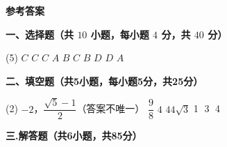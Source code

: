 \documentclass[11pt,a4paper]{ctexart}
\newcommand{\sectiontitle}[1]{
  \par\noindent\textbf{#1}\par%
  }
\newcounter{chapPage}
\begin{document}
\clearpage %
\setcounter{enumi}{0}   %
{} %
\setcounter{chapPage}{1} %

\begin{center} 
    {\LARGE \textbf{参考答案}}\\[1em]
\end{center}

\sectiontitle{一、选择题（共 $10$ 小题，每小题 $4$ 分，共 $40$ 分）}

    \begin{tasks}[label=(\arabic*), after-item-skip=0.6em,start=1] (5)
        \task $C$ 
        \task $C$
        \task $C$
        \task $A$        
        \task $B$
        \task $C$        
        \task $B$
        \task $D$        
        \task $D$
        \task $A$
    \end{tasks}

\sectiontitle{二、填空题（共5小题，每小题5分，共25分）}

    \begin{tasks}[label=(\arabic*), after-item-skip=0.6em,start=11] (2)
        \task $-2$，$\dfrac{\sqrt{5}-1}{2}$（答案不唯一） 
        \task $\dfrac{9}{8}$
        \task $4$
        \task $44 \sqrt{3}$        
        \task \textcircled{1} \textcircled{3} \textcircled{4}
    \end{tasks}

\sectiontitle{三.解答题（共6小题，共85分）}
\end{document}
